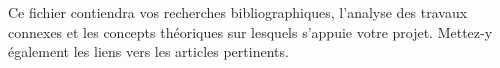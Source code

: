 Ce fichier contiendra vos recherches bibliographiques, l'analyse des travaux connexes et les concepts théoriques sur lesquels s'appuie votre projet. Mettez-y également les liens vers les articles pertinents.
